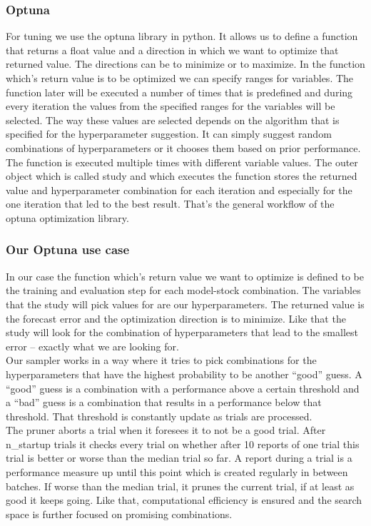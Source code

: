 \documentclass[a4paper,12pt]{report}
\begin{document}
				\subsubsection{Optuna}
For tuning we use the optuna library in python. It allows us to define a function that returns a float value and a direction in which we want to optimize that returned value. The directions can be to minimize or to maximize. 
In the function which’s return value is to be optimized we can specify ranges for variables. The function later will be executed a number of times that is predefined and during every iteration the values from the specified ranges for the variables will be selected. The way these values are selected depends on the algorithm that is specified for the hyperparameter suggestion. It can simply suggest random combinations of hyperparameters or it chooses them based on prior performance.
The function is executed multiple times with different variable values. The outer object which is called study and which executes the function stores the returned value and hyperparameter combination for each iteration and especially for the one iteration that led to the best result. That’s the general workflow of the optuna optimization library.\\
				\subsubsection{Our Optuna use case}
In our case the function which’s return value we want to optimize is defined to be the training and evaluation step for each model-stock combination. The variables that the study will pick values for are our hyperparameters. The returned value is the forecast error and the optimization direction is to minimize. Like that the study will look for the combination of hyperparameters that lead to the smallest error – exactly what we are looking for. \\
Our sampler works in a way where it tries to pick combinations for the hyperparameters that have the highest probability to be another “good” guess. A “good” guess is a combination with a performance above a certain threshold and a “bad” guess is a combination that results in a performance below that threshold. That threshold is constantly update as trials are processed.\\
The pruner aborts a trial when it foresees it to not be a good trial. After n\_startup trials it checks every trial on whether after 10 reports of one trial this trial is better or worse than the median trial so far. A report during a trial is a performance measure up until this point which is created regularly in between batches. If worse than the median trial, it prunes the current trial, if at least as good it keeps going. Like that, computational efficiency is ensured and the search space is further focused on promising combinations. \\\\
\end{document}
